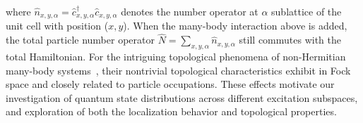 \documentclass[longbibliography, aps, prx, amsmath, amssymb, amsfonts, twocolumn,superscriptaddress, footinbib]{revtex4-1}
\begin{document}
	where $\hat{n}_{{x},{y},\alpha}=\hat{c}_{x,y,\alpha}^{\dagger}\hat{c}_{x,y,\alpha}$ denotes the number operator at $\alpha$ sublattice of the unit cell with position (${x},{y}$). When the many-body interaction above is added, the
	total particle number operator $\hat{N} = \sum_{x,y,\alpha} \hat{n}_{x,y,\alpha}$ still commutes with the total Hamiltonian.
    For the intriguing topological phenomena of non-Hermitian many-body systems~\cite{shen2024enhanced,shimomura2024general,deng2022observing}, their nontrivial topological characteristics exhibit in Fock space and closely related to particle occupations. These effects motivate our investigation of quantum state distributions across different excitation subspaces, and exploration of both the localization behavior and topological properties.

	



	
    
    

\end{document}
